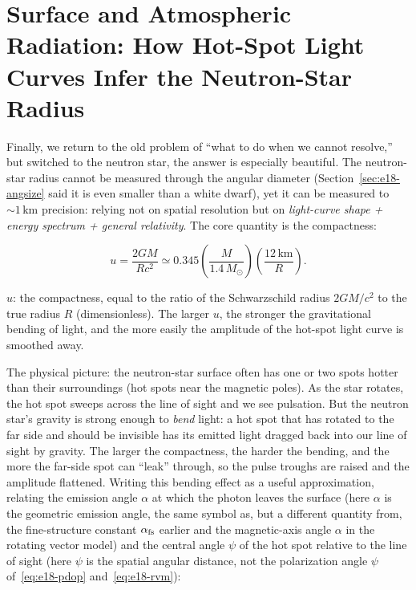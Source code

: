 \section{Surface and Atmospheric Radiation: How Hot-Spot Light Curves Infer the Neutron-Star Radius}
\label{sec:e18-hotspot}

Finally, we return to the old problem of ``what to do when we cannot resolve,'' but switched to the neutron star, the answer is especially beautiful. The neutron-star radius cannot be measured through the angular diameter (Section~\ref{sec:e18-angsize} said it is even smaller than a white dwarf), yet it can be measured to \(\sim1\,\mathrm{km}\) precision: relying not on spatial resolution but on \emph{light-curve shape + energy spectrum + general relativity}. The core quantity is the compactness:

\begin{equation}
  u=\frac{2GM}{Rc^2}
  \simeq 0.345
  \left(\frac{M}{1.4\,M_\odot}\right)
  \left(\frac{12\,\mathrm{km}}{R}\right).
  \label{eq:e18-compact}
\end{equation}
\begin{formulaexplain}
\(u\): the compactness, equal to the ratio of the Schwarzschild radius \(2GM/c^2\) to the true radius \(R\) (dimensionless). The larger \(u\), the stronger the gravitational bending of light, and the more easily the amplitude of the hot-spot light curve is smoothed away.
\end{formulaexplain}

The physical picture: the neutron-star surface often has one or two spots hotter than their surroundings (hot spots near the magnetic poles). As the star rotates, the hot spot sweeps across the line of sight and we see pulsation. But the neutron star's gravity is strong enough to \emph{bend} light: a hot spot that has rotated to the far side and should be invisible has its emitted light dragged back into our line of sight by gravity. The larger the compactness, the harder the bending, and the more the far-side spot can ``leak'' through, so the pulse troughs are raised and the amplitude flattened. Writing this bending effect as a useful approximation, relating the emission angle \(\alpha\) at which the photon leaves the surface (here \(\alpha\) is the geometric emission angle, the same symbol as, but a different quantity from, the fine-structure constant \(\alpha_{\rm fs}\) earlier and the magnetic-axis angle \(\alpha\) in the rotating vector model) and the central angle \(\psi\) of the hot spot relative to the line of sight (here \(\psi\) is the spatial angular distance, not the polarization angle \(\psi\) of~\eqref{eq:e18-pdop} and~\eqref{eq:e18-rvm}):

